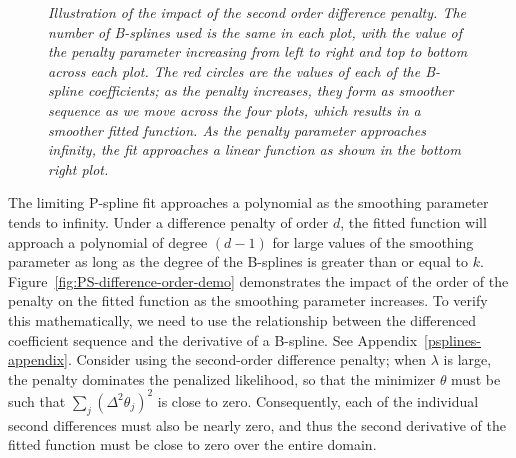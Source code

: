 \begin{figure}[H]
\begin{subfigure}{.5\textwidth}
  \label{fig:pspline_small_lambda}
\end{subfigure}
\caption{\textit{Illustration of the impact of the second order difference penalty. The number of B-splines used is the same in each plot, with the value of the penalty parameter increasing from left to right and top to bottom across each plot. The red circles are the values of each of the B-spline coefficients; as the penalty increases, they form as smoother sequence as we move across the four plots, which results in a smoother fitted function. As the penalty parameter approaches infinity, the fit approaches a linear function as shown in the bottom right plot.}}
\label{fig:increasing-lambda-pspline-fits}
\end{figure}
The limiting P-spline fit approaches a polynomial as the smoothing parameter tends to infinity. Under a difference penalty of order $d$, the fitted function will approach a polynomial of degree $\left(d-1\right)$ for large values of the smoothing parameter as long as the degree of the B-splines is greater than or equal to $k$. Figure~\ref{fig:PS-difference-order-demo} demonstrates the impact of the order of the penalty on the fitted function as the smoothing parameter increases. To verify this mathematically, we need to use the relationship between the differenced coefficient sequence and the derivative of a B-spline. See Appendix~\ref{psplines-appendix}. Consider using the second-order difference penalty; when $\lambda$ is large, the penalty dominates the penalized likelihood, so that the minimizer $\theta$ must be such that $\sum\limits_{j}\left(\Delta^2\theta_j\right)^2$ is close to zero. Consequently, each of the individual second differences must also be nearly zero, and thus the second derivative of the fitted function must be close to zero over the entire domain.
